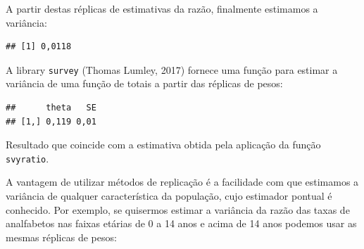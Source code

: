\documentclass[
  12pt,
  brazilian,
]{book}
\newenvironment{Shaded}{\begin{snugshade}}{\end{snugshade}}
\newcommand{\ControlFlowTok}[1]{\textcolor[rgb]{0.13,0.29,0.53}{\textbf{#1}}}
\newcommand{\DecValTok}[1]{\textcolor[rgb]{0.00,0.00,0.81}{#1}}
\newcommand{\FunctionTok}[1]{\textcolor[rgb]{0.00,0.00,0.00}{#1}}
\newcommand{\NormalTok}[1]{#1}
\newcommand{\OtherTok}[1]{\textcolor[rgb]{0.56,0.35,0.01}{#1}}
\newcommand{\SpecialCharTok}[1]{\textcolor[rgb]{0.00,0.00,0.00}{#1}}
\theoremstyle{definition}
\theoremstyle{definition}
\theoremstyle{definition}
\theoremstyle{definition}
\theoremstyle{remark}
\begin{document}
A partir destas réplicas de estimativas da razão, finalmente estimamos a variância:

\begin{Shaded}
\end{Shaded}

\begin{verbatim}
## [1] 0,0118
\end{verbatim}

A library \texttt{survey} (Thomas Lumley, 2017) fornece uma função para estimar a variância de uma função de totais a partir das réplicas de pesos:

\begin{Shaded}
\end{Shaded}

\begin{verbatim}
##      theta   SE
## [1,] 0,119 0,01
\end{verbatim}

Resultado que coincide com a estimativa obtida pela aplicação da função \texttt{svyratio}.

A vantagem de utilizar métodos de replicação é a facilidade com que estimamos a variância de qualquer
característica da população, cujo estimador pontual é conhecido. Por exemplo, se quisermos estimar a variância da razão das taxas de analfabetos nas faixas etárias de 0 a 14 anos e acima de 14 anos podemos usar as mesmas réplicas de pesos:
\end{document}
